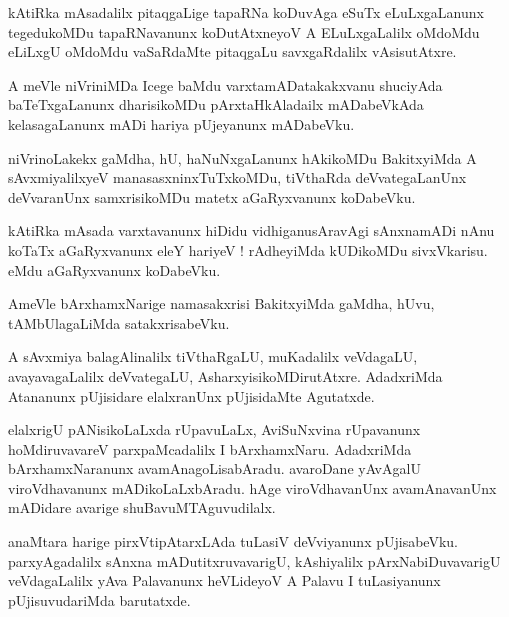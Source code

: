 \documentclass{article}
\begin{document}
\begin{mn}%
kAtiRka mAsadalilx pitaqgaLige tapaRNa koDuvAga eSuTx eLuLxgaLanunx tegedukoMDu tapaRNavanunx 
koDutAtxneyoV A ELuLxgaLalilx oMdoMdu eLiLxgU oMdoMdu vaSaRdaMte pitaqgaLu savxgaRdalilx 
vAsisutAtxre.
\end{mn}

\begin{mn}%
A meVle niVriniMDa Icege baMdu varxtamADatakakxvanu shuciyAda baTeTxgaLanunx dharisikoMDu 
pArxtaHkAladailx mADabeVkAda kelasagaLanunx mADi hariya pUjeyanunx mADabeVku.
\end{mn}

\begin{mn}%
niVrinoLakekx gaMdha, hU, haNuNxgaLanunx hAkikoMDu BakitxyiMda A sAvxmiyalilxyeV 
manasasxninxTuTxkoMDu, tiVthaRda deVvategaLanUnx deVvaranUnx samxrisikoMDu matetx aGaRyxvanunx 
koDabeVku.
\end{mn}

\begin{mn}%
kAtiRka mAsada varxtavanunx hiDidu vidhiganusAravAgi sAnxnamADi nAnu koTaTx aGaRyxvanunx eleY 
hariyeV ! rAdheyiMda kUDikoMDu sivxVkarisu. eMdu aGaRyxvanunx koDabeVku.
\end{mn}

\begin{mn}%
AmeVle bArxhamxNarige namasakxrisi BakitxyiMda gaMdha, hUvu, tAMbUlagaLiMda satakxrisabeVku.
\end{mn}

\begin{mn}%
A sAvxmiya balagAlinalilx tiVthaRgaLU, muKadalilx veVdagaLU, avayavagaLalilx deVvategaLU, 
AsharxyisikoMDirutAtxre. AdadxriMda Atananunx pUjisidare elalxranUnx pUjisidaMte Agutatxde.
\end{mn}

\begin{mn}%
elalxrigU pANisikoLaLxda rUpavuLaLx, AviSuNxvina rUpavanunx hoMdiruvavareV parxpaMcadalilx I 
bArxhamxNaru. AdadxriMda bArxhamxNaranunx avamAnagoLisabAradu. avaroDane yAvAgalU viroVdhavanunx 
mADikoLaLxbAradu. hAge viroVdhavanUnx avamAnavanUnx mADidare avarige shuBavuMTAguvudilalx.
\end{mn}

\begin{mn}%
anaMtara harige pirxVtipAtarxLAda tuLasiV deVviyanunx pUjisabeVku. parxyAgadalilx sAnxna 
mADutitxruvavarigU, kAshiyalilx pArxNabiDuvavarigU veVdagaLalilx yAva Palavanunx heVLideyoV A 
Palavu I tuLasiyanunx pUjisuvudariMda barutatxde.
\end{mn}
\end{document}
